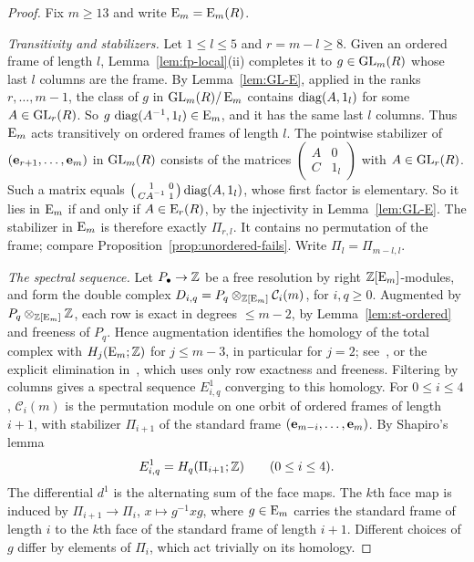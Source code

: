 \begin{proof}
Fix $m\geq13$ and write $\operatorname{E}_m=\operatorname{E}_m(R)$.

\emph{Transitivity and stabilizers.} Let $1\leq l\leq5$ and $r=m-l\geq8$. Given an ordered frame of length $l$,
Lemma~\ref{lem:fp-local}(ii) completes it to $g\in\operatorname{GL}_m(R)$ whose last $l$ columns are the frame. By
Lemma~\ref{lem:GL-E}, applied in the ranks $r,\dots,m-1$, the class of $g$ in $\operatorname{GL}_m(R)/\operatorname{E}_m$ contains
$\operatorname{diag}(A,1_l)$ for some $A\in\operatorname{GL}_r(R)$. So $g\,\operatorname{diag}(A^{-1},1_l)\in\operatorname{E}_m$, and it has the same last $l$ columns.
Thus $\operatorname{E}_m$ acts transitively on ordered frames of length $l$. The pointwise stabilizer of $(\mathbf e_{r+1},\dots,\mathbf e_m)$
in $\operatorname{GL}_m(R)$ consists of the matrices $\left(\begin{smallmatrix}A&0\\C&1_l\end{smallmatrix}\right)$ with
$A\in\operatorname{GL}_r(R)$. Such a matrix equals $\left(\begin{smallmatrix}1&0\\CA^{-1}&1\end{smallmatrix}\right)\operatorname{diag}(A,1_l)$,
whose first factor is elementary. So it lies in $\operatorname{E}_m$ if and only if $A\in\operatorname{E}_r(R)$, by the injectivity in
Lemma~\ref{lem:GL-E}. The stabilizer in $\operatorname{E}_m$ is therefore exactly $\Pi_{r,l}$. It contains no permutation of the
frame; compare Proposition~\ref{prop:unordered-fails}. Write $\Pi_l=\Pi_{m-l,l}$.

\emph{The spectral sequence.} Let $P_\bullet\to\mathbb Z$ be a free resolution by right $\mathbb Z[\operatorname{E}_m]$-modules, and form the
double complex $D_{i,q}=P_q\otimes_{\mathbb Z[\operatorname{E}_m]}\mathcal C_i(m)$, for $i,q\geq0$. Augmented by
$P_q\otimes_{\mathbb Z[\operatorname{E}_m]}\mathbb Z$, each row is exact in degrees $\leq m-2$, by Lemma~\ref{lem:st-ordered} and freeness of $P_q$.
Hence augmentation identifies the homology of the total complex with $H_j(\operatorname{E}_m;\mathbb Z)$ for $j\leq m-3$, in particular for
$j=2$; see~\cite[Chapter~VII]{Brown1982}, or the explicit elimination in~\cite[proof of Proposition~5.10]{OAI247periodic},
which uses only row exactness and freeness. Filtering by columns gives a spectral sequence $E^1_{i,q}$ converging to this
homology. For $0\leq i\leq4$, $\mathcal C_i(m)$ is the permutation module on one orbit of ordered frames of length $i+1$,
with stabilizer $\Pi_{i+1}$ of the standard frame $(\mathbf e_{m-i},\dots,\mathbf e_m)$. By Shapiro's lemma
\[
 E^1_{i,q}=H_q(\Pi_{i+1};\mathbb Z)\qquad(0\leq i\leq4).
\]
The differential $d^1$ is the alternating sum of the face maps. The $k$th face map is induced by
$\Pi_{i+1}\to\Pi_i$, $x\mapsto g^{-1}xg$, where $g\in\operatorname{E}_m$ carries the standard frame of length $i$ to
the $k$th face of the standard frame of length $i+1$. Different choices of $g$ differ by elements of $\Pi_i$,
which act trivially on its homology.


\end{proof}
